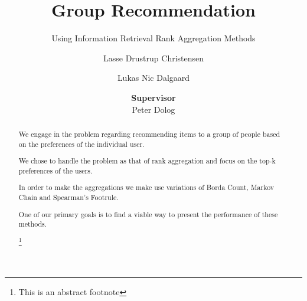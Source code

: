 \documentclass[sigplan]{acmart}
\begin{document}
\title{Group Recommendation}
\subtitle{Using Information Retrieval Rank Aggregation Methods}

\author{Lasse Drustrup Christensen}

\author{Lukas Nic Dalgaard}

\author{\textbf{Supervisor}\\ Peter Dolog}



\begin{abstract}
We engage in the problem regarding recommending items to a group of people based on the preferences of the individual user. 

We chose to handle the problem as that of rank aggregation and focus on the top-k preferences of the users.

In order to make the aggregations we make use variations of Borda Count, Markov Chain and Spearman's Footrule.

One of our primary goals is to find a viable way to present the performance of these methods. 


\footnote{This is an abstract footnote}
\end{abstract}




\maketitle








 


\end{document}
